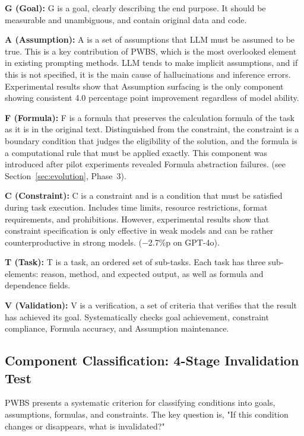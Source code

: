 \documentclass[11pt,a4paper]{article}
\begin{document}
\textbf{G (Goal):} G is a goal, clearly describing the end purpose. It should be measurable and unambiguous, and contain original data and code.

\textbf{A (Assumption):} A is a set of assumptions that LLM must be assumed to be true. This is a key contribution of PWBS, which is the most overlooked element in existing prompting methods. LLM tends to make implicit assumptions, and if this is not specified, it is the main cause of hallucinations and inference errors. Experimental results show that Assumption surfacing is the only component showing consistent 4.0 percentage point improvement regardless of model ability.

\textbf{F (Formula):} F is a formula that preserves the calculation formula of the task as it is in the original text. Distinguished from the constraint, the constraint is a boundary condition that judges the eligibility of the solution, and the formula is a computational rule that must be applied exactly. This component was introduced after pilot experiments revealed Formula abstraction failures. (see Section~\ref{sec:evolution}, Phase~3).

\textbf{C (Constraint):} C is a constraint and is a condition that must be satisfied during task execution. Includes time limits, resource restrictions, format requirements, and prohibitions. However, experimental results show that constraint specification is only effective in weak models and can be rather counterproductive in strong models. ($-$2.7\%p on GPT-4o).

\textbf{T (Task):} T is a task, an ordered set of sub-tasks. Each task has three sub-elements: reason, method, and expected output, as well as formula and dependence fields.

\textbf{V (Validation):} V is a verification, a set of criteria that verifies that the result has achieved its goal. Systematically checks goal achievement, constraint compliance, Formula accuracy, and Assumption maintenance.

\subsection{Component Classification: 4-Stage Invalidation Test}

PWBS presents a systematic criterion for classifying conditions into goals, assumptions, formulas, and constraints. The key question is, "If this condition changes or disappears, what is invalidated?"
\end{document}

